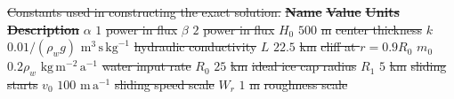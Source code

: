 \documentclass[gmd]{copernicus}   %
\newcommand{\text}{\textrm}
\providecommand{\DIFdel}[1]{{\protect\color{red}\sout{#1}}}                      %
\providecommand{\DIFdelbegin}{} %
\begin{document}
\DIFdelbegin %
{%
\DIFdel{Constants used in constructing the exact solution.}}
\textbf{\DIFdel{Name}} %
\textbf{\DIFdel{Value}} %
\textbf{\DIFdel{Units}} %
\textbf{\DIFdel{Description}}%
\DIFdel{$\alpha$ }%
\DIFdel{$1$ }%
\DIFdel{power in flux }%
\DIFdel{$\beta$  }%
\DIFdel{$2$ }%
\DIFdel{power in flux }%
\DIFdel{$H_0$ }%
\DIFdel{$500$ }%
\DIFdel{m }%
\DIFdel{center thickness }%
\DIFdel{$k$   }%
\DIFdel{$0.01/(\rho_w g)$ }%
\DIFdel{$\text{m}^3\,\text{s}\,\text{kg}^{-1}$ }%
\DIFdel{hydraulic conductivity }%
\DIFdel{$L$   }%
\DIFdel{$22.5$}%
\DIFdel{km }%
\DIFdel{cliff at $r=0.9 R_0$ }%
\DIFdel{$m_0$ }%
\DIFdel{$0.2\rho_w$ }%
\DIFdel{$\text{kg}\,\text{m}^{-2}\,\text{a}^{-1}$ }%
\DIFdel{water input rate }%
\DIFdel{$R_0$ }%
\DIFdel{$25$  }%
\DIFdel{km }%
\DIFdel{ideal ice cap radius }%
\DIFdel{$R_1$ }%
\DIFdel{$5$   }%
\DIFdel{km }%
\DIFdel{sliding starts }%
\DIFdel{$v_0$ }%
\DIFdel{$100$ }%
\DIFdel{$\text{m}\,\text{a}^{-1}$ }%
\DIFdel{sliding speed scale }%
\DIFdel{$W_r$ }%
\DIFdel{$1$ }%
\DIFdel{m }%
\DIFdel{roughness scale }%
\end{document}
